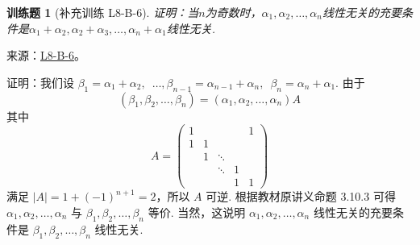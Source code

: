 \documentclass[12pt,fontset=fandol]{ctexart}
\newtheorem{exercise}{训练题}[section]
\begin{document}
\begin{exercise}[补充训练 L8-B-6]\label{prob:L8-B-6}
证明：当$n$为奇数时，$\alpha_1,\alpha_2,\ldots,\alpha_n$线性无关的充要条件是$\alpha_1+\alpha_2,\alpha_2+\alpha_3,\ldots,\alpha_n+\alpha_1$线性无关.
\end{exercise}
\noindent 来源：\href{https://github.com/yhwu-is/Linear-Algebra-Left-Undone/blob/new/%E8%AE%B2%E4%B9%89/%E4%B8%93%E9%A2%98/8%20%E7%9B%B8%E6%8A%B5%E6%A0%87%E5%87%86%E5%BD%A2.tex}{L8-B-6}。
\begin{solve}
证明：我们设 $ \beta_1 = \alpha_1 + \alpha_2,\enspace \ldots, \beta_{n - 1} = \alpha_{n - 1} + \alpha_n,\enspace \beta_n = \alpha_n + \alpha_1 $. 由于
            \[ (\beta_1, \beta_2, \ldots, \beta_n) = (\alpha_1, \alpha_2, \ldots, \alpha_n) A \]
            其中
            \[ A = \begin{pmatrix}
                    1 &   &        &   & 1 \\
                    1 & 1 &        &   &   \\
                        & 1 & \ddots &   &   \\
                        &   & \ddots & 1 &   \\
                        &   &        & 1 & 1
                \end{pmatrix} \]
            满足 $ |A| = 1 + (-1)^{n + 1} = 2 $，所以 $ A $ 可逆. 根据教材原讲义命题 3.10.3 可得 $ \alpha_1, \alpha_2, \ldots, \alpha_n $ 与 $ \beta_1, \beta_2, \ldots, \beta_n $ 等价. 当然，这说明 $ \alpha_1, \alpha_2, \ldots, \alpha_n $ 线性无关的充要条件是 $ \beta_1, \beta_2, \ldots, \beta_n $ 线性无关.
\end{solve}
\end{document}
